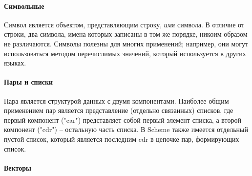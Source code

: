 
\paragraph{Символьные}

Символ является объектом, представляющим строку, \textit{имя} символа. В отличие от строки, два
символа, имена которых записаны в том же порядке, никоим образом не различаются. Символы полезны
для многих применений; например, они могут использоваться методом перечислимых значений,
который используется в других языках.

\paragraph{Пары и списки}

Пара является структурой данных с двумя компонентами. Наиболее общим применением пар является
представление (отдельно связанных) списков, где первый компонент ("car") представляет собой
первый элемент списка, а второй компонент ("cdr") -- остальную часть списка. В Scheme также
имеется отдельный пустой список, который является последним cdr в цепочке пар, формирующих
список.

\paragraph{Векторы}

